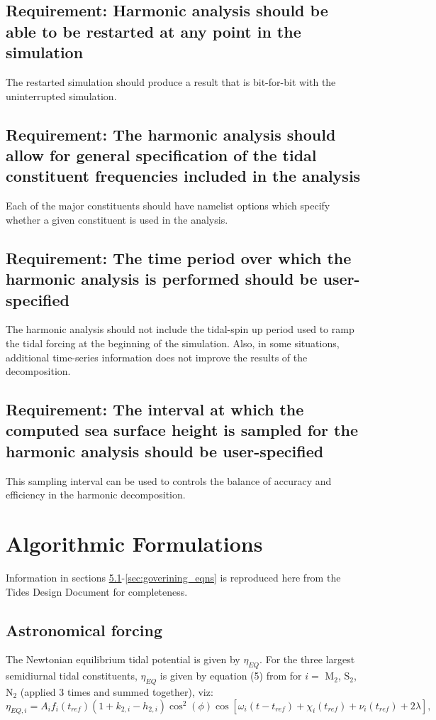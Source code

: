 \documentclass[11pt]{report}
\begin{document}
\section{Requirement: Harmonic analysis should be able to be restarted at any point in the simulation}
The restarted simulation should produce a result that is bit-for-bit with the uninterrupted simulation.

\section{Requirement: The harmonic analysis should allow for general specification of the tidal constituent frequencies included in the analysis}
Each of the major constituents should have namelist options which specify whether a given constituent is used in the analysis.

\section{Requirement: The time period over which the harmonic analysis is performed should be user-specified}
The harmonic analysis should not include the tidal-spin up period used to ramp the tidal forcing at the beginning of the simulation. Also, in some situations, additional time-series information does not improve the results of the decomposition.

\section{Requirement: The interval at which the computed sea surface height is sampled for the harmonic analysis should be user-specified }
This sampling interval can be used to controls the balance of accuracy and efficiency in the harmonic decomposition.

\chapter{Algorithmic Formulations}
Information in sections \ref{sec:astronomical_forcing}-\ref{sec:goverining_eqns} is reproduced here from the Tides Design Document for completeness.

\section{Astronomical forcing}
\label{sec:astronomical_forcing}
The Newtonian equilibrium tidal potential is given by $\eta_{EQ}$.  For the three largest semidiurnal tidal constituents, $\eta_{EQ}$ is given by equation (5) from \citet{chassignet_primer_2018} for $i=$ M$_{2}$, S$_{2}$, N$_{2}$ (applied 3 times and summed together), viz:
\begin{equation}
\eta_{EQ,i} = A_if_i(t_{ref})(1+k_{2,i}-h_{2,i})\cos^2(\phi)\cos\left[\omega_i(t-t_{ref}) + \chi_i(t_{ref}) + \nu_i(t_{ref}) + 2\lambda\right],
\label{eq:Eq5}
\end{equation}
\end{document}
